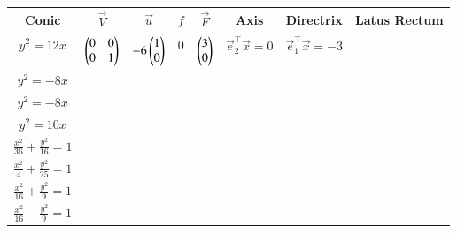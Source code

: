 \begin{tabular}{|c|c|c|c|c|c|c|c|}
\hline
Conic & $\vec{V}$ & $\vec{u}$ & $f$ &  $\vec{F}$ & Axis & Directrix & Latus Rectum\\
\hline
$y^2=12x$  & $\begin{pmatrix} 0 & 0 \\ 0 & 1\end{pmatrix}$  & $-6\begin{pmatrix} 1 \\ 0\end{pmatrix}$ & 0 &  $\begin{pmatrix}3 \\ 0\end{pmatrix} $& $\vec{e}_2^{\top}\vec{x} = 0$ &$\vec{e}_1^{\top}\vec{x} = -3$  &  \\
\hline
$y^2 = -8x$ &  &  &  &  &  &    \\
\hline
$y^2=-8x$ &  &  &  &  &  &    \\
\hline
$y^2=10x$   &  &  &  &  &    &  \\
\hline
$\frac{x^2}{36}+\frac{y^2}{16}=1$ &    &  &  &  &  &  \\
\hline
$\frac{x^2}{4}+\frac{y^2}{25}=1$ &  &    &  &  &  &  \\
\hline
$\frac{x^2}{16}+\frac{y^2}{9}=1$ &  &    &  &  &  &  \\
\hline
$\frac{x^2}{16}-\frac{y^2}{9} = 1$ &    &  &  &  &  &  \\
\hline
\end{tabular}

